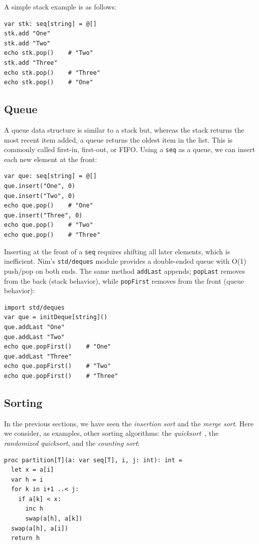 \documentclass[justified, sixbynine]{tufte-book}
\def\ft{\small\tt}
\theoremstyle{plain}%
\newtheorem * {corollary}{Corollary}
\theoremstyle{definition}
\theoremstyle{remark}
\newtheorem * {remark}{Remark}
\newtheorem * {note}{Note}
\begin{document}
\begin{fullwidth}
A simple stack example is as follows:

\begin{lstlisting}
var stk: seq[string] = @[]
stk.add "One"
stk.add "Two"
echo stk.pop()    # "Two"
stk.add "Three"
echo stk.pop()    # "Three"
echo stk.pop()    # "One"
\end{lstlisting}


\goodbreak\subsection{Queue}

A queue data structure is similar to a stack but, whereas the stack returns the most recent item added, a queue returns the oldest item in the list.  This is commonly called first-in, first-out, or FIFO.  Using a {\ft seq} as a queue, we can insert each new element at the front:

\begin{lstlisting}
var que: seq[string] = @[]
que.insert("One", 0)
que.insert("Two", 0)
echo que.pop()    # "One"
que.insert("Three", 0)
echo que.pop()    # "Two"
echo que.pop()    # "Three"
\end{lstlisting}

Inserting at the front of a {\ft seq} requires shifting all later elements, which is inefficient. Nim's {\ft std/deques} module provides a double-ended queue with O(1) push/pop on both ends. The same method {\ft addLast} appends; {\ft popLast} removes from the back (stack behavior), while {\ft popFirst} removes from the front (queue behavior):

\begin{lstlisting}
import std/deques
var que = initDeque[string]()
que.addLast "One"
que.addLast "Two"
echo que.popFirst()    # "One"
que.addLast "Three"
echo que.popFirst()    # "Two"
echo que.popFirst()    # "Three"
\end{lstlisting}


\goodbreak\subsection{Sorting}


In the previous sections, we have seen the {\it insertion sort} and the {\it merge sort}. Here we consider, as examples, other sorting algorithms: the {\it quicksort}~\cite{mergesort}, the {\it randomized quicksort}, and the {\it counting sort}:

\begin{lstlisting}
proc partition[T](a: var seq[T], i, j: int): int =
  let x = a[i]
  var h = i
  for k in i+1 ..< j:
    if a[k] < x:
      inc h
      swap(a[h], a[k])
  swap(a[h], a[i])
  return h


\end{lstlisting}
\end{fullwidth}
\end{document}

